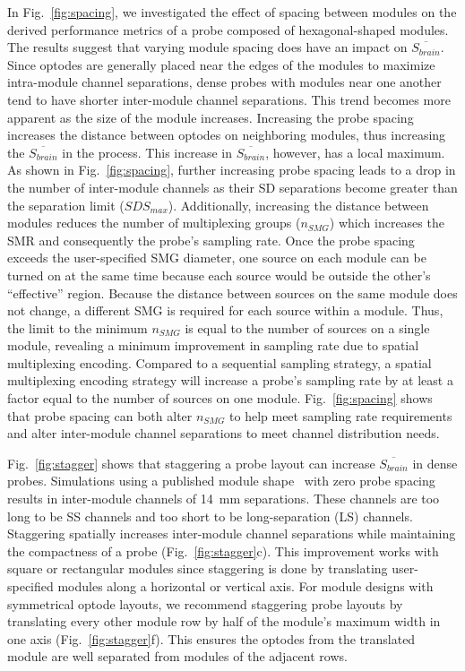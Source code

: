 {%
In Fig.~\ref{fig:spacing}, we investigated the effect of spacing between modules on the derived performance metrics of a probe composed of hexagonal-shaped modules. The results suggest that varying module spacing does have an impact on $\overline{S_{brain}}$. Since optodes are generally placed near the edges of the modules to maximize intra-module channel separations, dense probes with modules near one another tend to have shorter inter-module channel separations. This trend becomes more apparent as the size of the module increases. Increasing the probe spacing increases the distance between optodes on neighboring modules, thus increasing the $\overline{S_{brain}}$ in the process. This increase in $\overline{S_{brain}}$, however, has a local maximum. As shown in Fig.~\ref{fig:spacing}, further increasing probe spacing leads to a drop in the number of inter-module channels as their \ac{SD} separations become greater than the separation limit ($SDS_{max}$). Additionally, increasing the distance between modules reduces the number of multiplexing groups ($n_{SMG}$) which increases the \ac{SMR} and consequently the probe's sampling rate. Once the probe spacing exceeds the user-specified \ac{SMG} diameter, one source on each module can be turned on at the same time because each source would be outside the other's ``effective'' region. Because the distance between sources on the same module does not change, a different \ac{SMG} is required for each source within a module. Thus, the limit to the minimum $n_{SMG}$ is equal to the number of sources on a single module, revealing a minimum improvement in sampling rate due to spatial multiplexing encoding. Compared to a sequential sampling strategy, a spatial multiplexing encoding strategy will increase a probe's sampling rate by at least a factor equal to the number of sources on one module. Fig.~\ref{fig:spacing} shows that probe spacing can both alter $n_{SMG}$ to help meet sampling rate requirements and alter inter-module channel separations to meet channel distribution needs.

Fig.~\ref{fig:stagger} shows that staggering a probe layout can increase $\overline{S_{brain}}$ in dense probes. Simulations using a published module shape~\cite{Bci2017} with zero probe spacing results in inter-module channels of 14~mm separations. These channels are too long to be \ac{SS} channels and too short to be long-separation (LS) channels. Staggering spatially increases inter-module channel separations while maintaining the compactness of a probe (Fig.~\ref{fig:stagger}c). This improvement works with square or rectangular modules since staggering is done by translating user-specified modules along a horizontal or vertical axis. For module designs with symmetrical optode layouts, we recommend staggering probe layouts by translating every other module row by half of the module's maximum width in one axis (Fig.~\ref{fig:stagger}f). This ensures the optodes from the translated module are well separated from modules of the adjacent rows.

}
